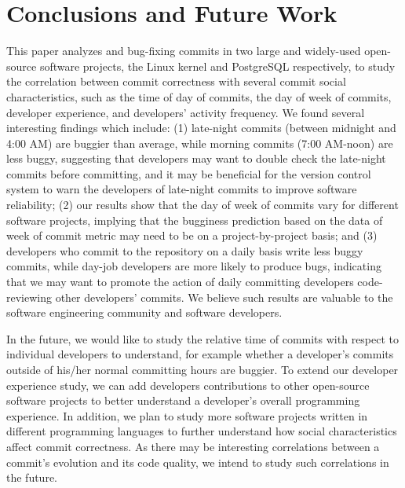 \section{Conclusions and Future Work}
\label{sec-conclusion}

This paper analyzes \linuxBFC and \postBFC bug-fixing commits in two large and widely-used open-source software projects, 
the Linux kernel and PostgreSQL respectively, to study the correlation between commit correctness with 
several commit social characteristics, such as the time of day of commits,
the day of week of commits, developer experience, and developers' activity
frequency. We found several interesting findings which include: (1)  
late-night commits (between midnight and 4:00 AM) are buggier than average, 
while morning commits (7:00 AM-noon) are less buggy, suggesting 
that developers may want to double check the late-night commits before committing, 
and it may be beneficial for the version control
system to warn the developers of late-night commits to improve software reliability; 
(2) 
our results show that the day of week of commits
vary for different software projects, 
implying that the bugginess prediction based on the data of week of commit metric 
may need to be on a project-by-project basis;
and (3) developers who commit to the repository on a daily basis
write less buggy commits, while day-job developers are more likely to produce
bugs, indicating that we may
want to promote the action of daily committing developers code-reviewing other
developers' commits.
We believe such results are valuable to the software engineering community and 
software developers. 

In the future, we would like to study the relative time of commits with respect to individual developers to 
understand, for example whether a developer's commits outside of his/her normal committing hours are buggier.
To extend our developer experience study, we can add developers contributions to other open-source software projects
to better understand a developer's overall programming experience. 
In addition, we plan to study more software projects written in different programming languages
to further understand how social characteristics affect commit correctness. 
As there may be interesting correlations between a commit's evolution and its code quality,
we intend to study such correlations in the future.


